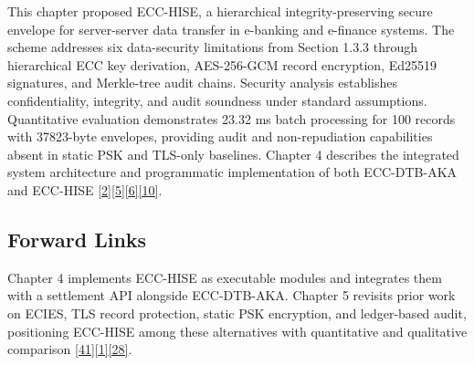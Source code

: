 \indent This chapter proposed ECC-HISE, a hierarchical integrity-preserving secure envelope for server-server data transfer in e-banking and e-finance systems. The scheme addresses six data-security limitations from Section 1.3.3 through hierarchical ECC key derivation, AES-256-GCM record encryption, Ed25519 signatures, and Merkle-tree audit chains. Security analysis establishes confidentiality, integrity, and audit soundness under standard assumptions. Quantitative evaluation demonstrates 23.32 ms batch processing for 100 records with 37823-byte envelopes, providing audit and non-repudiation capabilities absent in static PSK and TLS-only baselines. Chapter 4 describes the integrated system architecture and programmatic implementation of both ECC-DTB-AKA and ECC-HISE \hyperref[ref:2]{[2]}\hyperref[ref:5]{[5]}\hyperref[ref:6]{[6]}\hyperref[ref:10]{[10]}.

\subsection{Forward Links}

\indent Chapter 4 implements ECC-HISE as executable modules and integrates them with a settlement API alongside ECC-DTB-AKA. Chapter 5 revisits prior work on ECIES, TLS record protection, static PSK encryption, and ledger-based audit, positioning ECC-HISE among these alternatives with quantitative and qualitative comparison \hyperref[ref:41]{[41]}\hyperref[ref:1]{[1]}\hyperref[ref:28]{[28]}.

